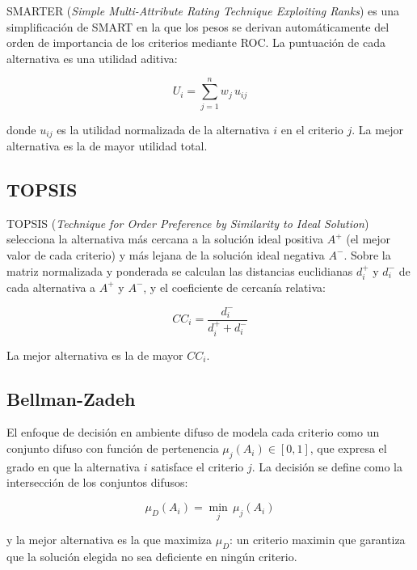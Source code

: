 SMARTER (\textit{Simple Multi-Attribute Rating Technique Exploiting Ranks}) \citep{Edwards1994} es una simplificación de SMART en la que los pesos se derivan automáticamente del orden de importancia de los criterios mediante ROC. La puntuación de cada alternativa es una utilidad aditiva:

\begin{equation}
U_i = \sum_{j=1}^{n} w_j \, u_{ij}
\end{equation}

donde $u_{ij}$ es la utilidad normalizada de la alternativa $i$ en el criterio $j$. La mejor alternativa es la de mayor utilidad total.

\subsection{TOPSIS}

TOPSIS (\textit{Technique for Order Preference by Similarity to Ideal Solution}) \citep{Hwang1981} selecciona la alternativa más cercana a la solución ideal positiva $A^+$ (el mejor valor de cada criterio) y más lejana de la solución ideal negativa $A^-$. Sobre la matriz normalizada y ponderada se calculan las distancias euclidianas $d_i^+$ y $d_i^-$ de cada alternativa a $A^+$ y $A^-$, y el coeficiente de cercanía relativa:

\begin{equation}
CC_i = \frac{d_i^-}{d_i^+ + d_i^-}
\end{equation}

La mejor alternativa es la de mayor $CC_i$.

\subsection{Bellman-Zadeh}

El enfoque de decisión en ambiente difuso de \citet{Bellman1970} modela cada criterio como un conjunto difuso con función de pertenencia $\mu_j(A_i) \in [0, 1]$, que expresa el grado en que la alternativa $i$ satisface el criterio $j$. La decisión se define como la intersección de los conjuntos difusos:

\begin{equation}
\mu_D(A_i) = \min_{j} \, \mu_j(A_i)
\end{equation}

y la mejor alternativa es la que maximiza $\mu_D$: un criterio maximin que garantiza que la solución elegida no sea deficiente en ningún criterio.

